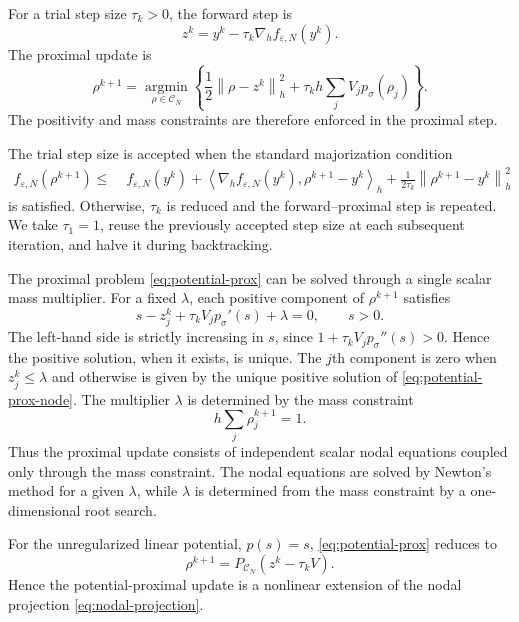 \documentclass[11pt]{article}
\newcommand{\CN}{\mathcal{C}_N}
\newcommand{\eps}{\varepsilon}
\newcommand{\sig}{\sigma}
\newcommand{\inner}[2]{\left\langle #1,#2\right\rangle}
\newcommand{\norm}[1]{\left\|#1\right\|}
\theoremstyle{plain}
\theoremstyle{definition}
\numberwithin{equation}{section}
\begin{document}
For a trial step size $\tau_k>0$, the forward step is
\begin{equation}
\label{eq:fista-forward}
z^k
=
y^k-\tau_k\nabla_h f_{\eps,N}(y^k).
\end{equation}
The proximal update is
\begin{equation}
\label{eq:potential-prox}
\rho^{k+1}
=
\operatorname*{argmin}_{\rho\in\CN}
\left\{
\frac12\norm{\rho-z^k}_h^2
+
\tau_k h\sum_jV_jp_\sig(\rho_j)
\right\}.
\end{equation}
The positivity and mass constraints are therefore enforced in the
proximal step.

The trial step size is accepted when the standard majorization
condition
\begin{equation}
\label{eq:fista-backtracking}
\begin{aligned}
f_{\eps,N}(\rho^{k+1})
\le\;&
f_{\eps,N}(y^k)
+
\inner{\nabla_h f_{\eps,N}(y^k)}
       {\rho^{k+1}-y^k}_h 
+
\frac{1}{2\tau_k}
\norm{\rho^{k+1}-y^k}_h^2
\end{aligned}
\end{equation}
is satisfied. Otherwise, $\tau_k$ is reduced and the
forward--proximal step is repeated. We take $\tau_1=1$, reuse the
previously accepted step size at each subsequent iteration, and halve
it during backtracking.

The proximal problem \eqref{eq:potential-prox} can be solved through
a single scalar mass multiplier. For a fixed $\lambda$, each positive
component of $\rho^{k+1}$ satisfies
\begin{equation}
\label{eq:potential-prox-node}
s-z_j^k
+\tau_kV_jp_\sig'(s)
+\lambda
=
0,
\qquad s>0.
\end{equation}
The left-hand side is strictly increasing in $s$, since
\(
1+\tau_kV_jp_\sig''(s)>0.
\)
Hence the positive solution, when it exists, is unique. The $j$th
component is zero when $z_j^k\le\lambda$ and otherwise is given by
the unique positive solution of
\eqref{eq:potential-prox-node}. The multiplier $\lambda$ is determined
by the mass constraint
\[
h\sum_j\rho_j^{k+1}=1.
\]
Thus the proximal update consists of independent scalar nodal equations coupled only through the mass constraint. The nodal equations are solved by Newton's method for a given \(\lambda\), while \(\lambda\) is determined from the mass constraint by a one-dimensional root search.

For the unregularized linear potential, $p(s)=s$,
\eqref{eq:potential-prox} reduces to
\[
\rho^{k+1}
=
P_{\CN}(z^k-\tau_kV).
\]
Hence the potential-proximal update is a nonlinear extension of the
nodal projection \eqref{eq:nodal-projection}.
\end{document}
